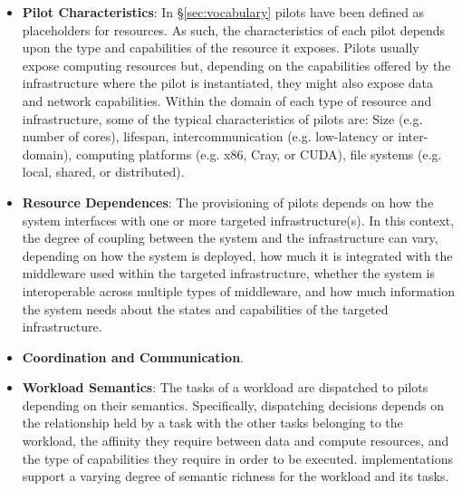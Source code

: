 \documentclass{sig-alternate}
\begin{document}
\begin{itemize}

\item \textbf{Pilot Characteristics}: In \S\ref{sec:vocabulary} pilots
  have been defined as placeholders for resources. As such, the
  characteristics of each pilot depends upon the type and capabilities
  of the resource it exposes.  Pilots usually expose computing
  resources but, depending on the capabilities offered by the
  infrastructure where the pilot is instantiated, they might also
  expose data and network capabilities. Within the domain of each type
  of resource and infrastructure, some of the typical characteristics
  of pilots are: Size (e.g. number of cores), lifespan,
  intercommunication (e.g. low-latency or inter-domain), computing
  platforms (e.g. x86, Cray, or CUDA), file systems (e.g. local,
  shared, or distributed). 


\item \textbf{Resource Dependences}: The provisioning of pilots
  depends on how the \pilotjob system interfaces with one or more
  targeted infrastructure(s). In this context, the degree of coupling
  between the \pilotjob system and the infrastructure can vary,
  depending on how the \pilotjob system is deployed, how much it is
  integrated with the middleware used within the targeted
  infrastructure, whether the \pilotjob system is interoperable across
  multiple types of middleware, and how much information the \pilotjob
  system needs about the states and capabilities of the targeted
  infrastructure.

\item \textbf{Coordination and Communication}. 

\item \textbf{Workload Semantics}: The tasks of a workload are
  dispatched to pilots depending on their semantics. Specifically,
  dispatching decisions depends on the relationship held by a task
  with the other tasks belonging to the workload, the affinity they
  require between data and compute resources, and the type of
  capabilities they require in order to be executed.  \pilotjob
  implementations support a varying degree of semantic richness for
  the workload and its tasks.


\end{itemize}
\end{document}
